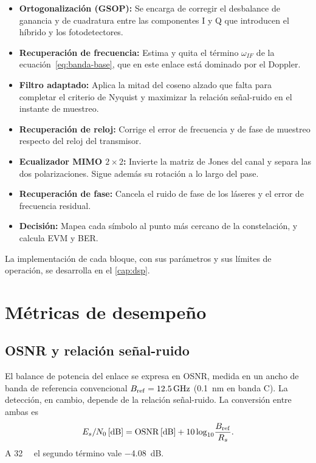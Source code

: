 \begin{itemize}\itemsep2pt
  \item \textbf{Ortogonalizaci\'on (GSOP):} Se encarga de corregir el
        desbalance de ganancia y de cuadratura entre las componentes I y Q que
        introducen el h\'ibrido y los fotodetectores.
  \item \textbf{Recuperaci\'on de frecuencia:} Estima y quita el t\'ermino
        $\omega_{IF}$ de la ecuaci\'on~\eqref{eq:banda-base}, que en este
        enlace est\'a dominado por el Doppler.
  \item \textbf{Filtro adaptado:} Aplica la mitad del coseno alzado que falta
        para completar el criterio de Nyquist y maximizar la relaci\'on
        se\~nal-ruido en el instante de muestreo.
  \item \textbf{Recuperaci\'on de reloj:} Corrige el error de frecuencia y de
        fase de muestreo respecto del reloj del transmisor.
  \item \textbf{Ecualizador MIMO $2\times2$:} Invierte la matriz de Jones del
        canal y separa las dos polarizaciones. Sigue adem\'as su rotaci\'on a
        lo largo del pase.
  \item \textbf{Recuperaci\'on de fase:} Cancela el ruido de fase de los
        l\'aseres y el error de frecuencia residual.
  \item \textbf{Decisi\'on:} Mapea cada s\'imbolo al punto m\'as cercano de la
        constelaci\'on, y calcula EVM y BER.
\end{itemize}

La implementaci\'on de cada bloque, con sus par\'ametros y sus l\'imites de
operaci\'on, se desarrolla en el \cref{cap:dsp}.

\section{M\'etricas de desempe\~no}
\label{sec:coh-metricas}

\subsection{OSNR y relaci\'on se\~nal-ruido}
\label{sec:coh-osnr}

El balance de potencia del enlace se expresa en OSNR, medida en un ancho de
banda de referencia convencional $B_{\mathrm{ref}} = \SI{12.5}{\giga\hertz}$
(\SI{0.1}{\nano\metre} en banda C). La detecci\'on, en cambio, depende de la
relaci\'on se\~nal-ruido. La conversi\'on entre ambas es
\begin{equation}
  \EsNo\,[\si{\dB}] = \OSNR\,[\si{\dB}] + 10\log_{10}\!\frac{\Bref}{\Rs}.
  \label{eq:osnr-esno}
\end{equation}
A \SI{32}{\giga\baud} el segundo t\'ermino vale \SI{-4.08}{\dB}.

